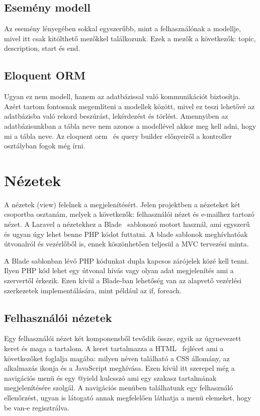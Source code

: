 \documentclass[
]{thesis-ekf}
\theoremstyle{definition}
\theoremstyle{remark}
\begin{document}
\subsection{Esemény modell}
Az esemény lényegében sokkal egyszerűbb, mint a felhasználónak a modellje, mivel itt csak kitölthető mezőkkel találkozunk. Ezek a mezők a következők: topic, description, start és end.

\subsection{Eloquent ORM}
Ugyan ez nem modell, hanem az adatbázissal való kommunikációt biztosítja. Azért tartom fontosnak megemlíteni a modellek között, mivel ez teszi lehetővé az adatbázisba való rekord beszúrást, lekérdezést és törlést. Amennyiben az adatbázisunkban a tábla neve nem azonos a modellével akkor meg kell adni, hogy mi a tábla neve. Az eloquent orm~\cite{laravel_eloquent} és query builder előnyeiről a kontroller osztályban fogok még írni.

\section{Nézetek}
A nézetek (view) felelnek a megjelenítésért. Jelen projektben a nézeteket két csoportba osztanám, melyek a következők: felhasználói nézet és e-mailhez tartozó nézet. A Laravel a nézetekhez a Blade~\cite{laravel_blade} sablonozó motort használ, ami egyszerű és ugyan úgy lehet benne PHP kódot futtatni. A blade sablonok meghívhatóak útvonalról és vezérlőből is, ennek köszönhetően teljesül a MVC tervezési minta. 

A Blade sablonban lévő PHP kódunkat dupla kapcsos zárójelek közé kell tenni. Ilyen PHP kód lehet egy útvonal hívás vagy olyan adat megjelenítés ami a szervertől érkezik. Ezen kívül a Blade-ban lehetőség van az alapvető vezérlési szerkezetek implementálására, mint például az if, foreach.

\subsection{Felhasználói nézetek}

Egy felhasználói nézet két komponensből tevődik össze, egyik az úgynevezett keret és maga a tartalom. A keret tartalmazza a HTML~\cite{html_doc} fejlécet ami a következőket foglalja magába: milyen néven található a CSS állomány, az alkalmazás ikonja és a JavaScript meghívása. Ezen kívül itt szerepel még a navigációs menü és egy @yield kulcsszó ami egy szakasz tartalmának megjelenítésére szolgál. A navigációs menüben találhatunk egy felhasználó ellenőrzést, ugyan is látogató annak megfelelően láthatja a menü elemeket, hogy be van-e regisztrálva.
\end{document}
